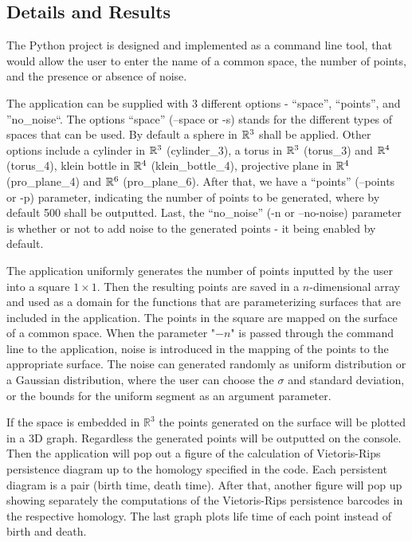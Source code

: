 \documentclass[11pt,a4paper]{report}
\begin{document}
            \subsection{Details and Results}

            The Python project is designed and implemented as a command line tool, that would allow the user to enter the name
            of a common space, the number of points, and the presence or absence of noise.

            The application can be supplied with 3 different options - ``space'', ``points'', and ''no\_noise``. The options ``space'' (--space or -s) stands for the different types of spaces that can be used. By default a sphere in $\mathbb{R}^3$  shall be applied. Other options include a cylinder in $\mathbb{R}^3$ (cylinder\_3), a torus in $\mathbb{R}^3$ (torus\_3) and $\mathbb{R}^4$ (torus\_4), klein bottle in $\mathbb{R}^4$ (klein\_bottle\_4), projective plane in $\mathbb{R}^4$ (pro\_plane\_4) and $\mathbb{R}^6$ (pro\_plane\_6). After that, we have a ``points'' (--points or -p) parameter, indicating the number of points to be generated, where by default 500 shall be outputted. Last, the ``no\_noise'' (-n or --no-noise) parameter is whether or not to add noise to the generated points - it being enabled by default.

            The application uniformly generates the number of points inputted by the user into a square $1 \times 1$. Then the resulting points are saved in a $n$-dimensional array and used as a domain for the functions that are parameterizing surfaces that are included in the application. The points in the square are mapped on the surface of a common space. When the parameter "$-n$" is passed through the command line to the application, noise is introduced in the mapping of the points to the appropriate surface. The noise can generated randomly as uniform distribution or a Gaussian distribution, where the user can choose the $\sigma$ and standard deviation, or the bounds for the uniform segment as an argument parameter.

            If the space is embedded in $\mathbb{R}^3$ the points generated on the surface will be plotted in a 3D graph. Regardless the generated points will be outputted on the console. Then the application will pop out a figure of the calculation of Vietoris-Rips persistence diagram up to the homology specified in the code. Each persistent diagram is a pair (birth time, death time).  
            After that, another figure will pop up showing separately the computations of the Vietoris-Rips persistence barcodes in the respective homology. The last graph plots life time of each point instead of birth and death.
\end{document}
